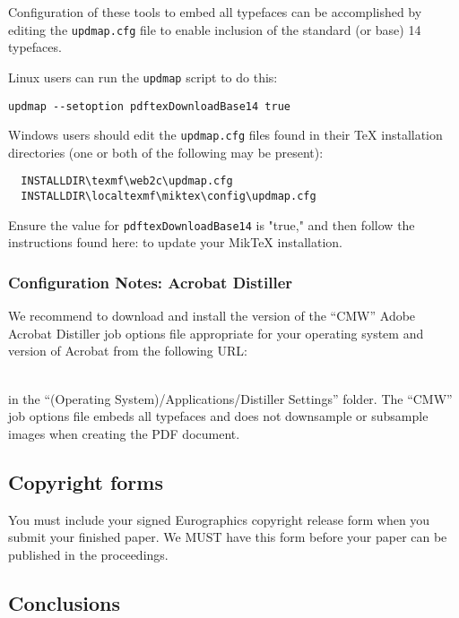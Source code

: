 \noindent
Configuration of these tools to embed all typefaces can be accomplished by editing the \texttt{updmap.cfg} file
to enable inclusion of the standard (or base) 14 typefaces.

Linux users can run the \texttt{updmap} script to do this:
\begin{verbatim}
updmap --setoption pdftexDownloadBase14 true
\end{verbatim}

Windows users should edit the \texttt{updmap.cfg} files found in their TeX installation directories (one or both
of the following may be present):
\begin{verbatim}
  INSTALLDIR\texmf\web2c\updmap.cfg
  INSTALLDIR\localtexmf\miktex\config\updmap.cfg
\end{verbatim}

Ensure the value for \texttt{pdftexDownloadBase14} is "true," and then follow the instructions found here:
 to update your MikTeX installation.

\subsubsection*{Configuration Notes: Acrobat Distiller}

We recommend to download and install the version of the ``CMW'' Adobe Acrobat Distiller job options file
appropriate for your operating system and version of Acrobat from the following URL:

\\
in the ``(Operating System)/Applications/Distiller Settings'' folder. The ``CMW'' job options file embeds
all typefaces and does not downsample or subsample images when creating the PDF document.
\subsection{Copyright forms}

You must include your signed Eurographics copyright release form
when you submit your finished paper. We MUST have this form before
your paper can be published in the proceedings.

\subsection{Conclusions}


